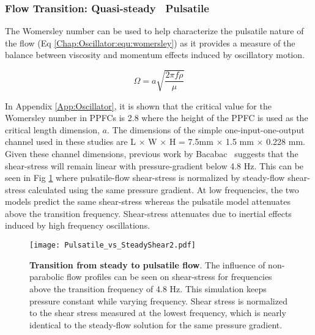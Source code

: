 \subsubsection{Flow Transition: Quasi-steady \vs\ Pulsatile}
The Womersley number can be used to help characterize the pulsatile nature of the flow (Eq \ref{Chap:Oscillator:equ:womersley}) as it provides a measure of the balance between viscosity and momentum effects induced by oscillatory motion. 

\begin{equation}
\Omega = a \sqrt{\frac{2 \pi f \rho}{\mu}}
\label{Chap:Oscillator:equ:womersley}
\end{equation}
 
In Appendix \ref{App:Oscillator}, it is shown that the critical value for the Womersley number in PPFCs is 2.8 where the height of the PPFC is used as the critical length dimension, $a$. The dimensions of the simple one-input-one-output channel used in these studies are L $\times$ W $\times$ H = 7.5mm $\times$ 1.5 mm $\times$ 0.228 mm. Given these channel dimensions, previous work by Bacabac \etal\ suggests that the shear-stress will remain linear with pressure-gradient below 4.8 Hz. This can be seen in Fig \ref{Chap:Oscillator:fig:flowTransition} where pulsatile-flow shear-stress is normalized by steady-flow shear-stress calculated using the same pressure gradient. At low frequencies, the two models predict the same shear-stress whereas the pulsatile model attenuates above the transition frequency. Shear-stress attenuates due to inertial effects induced by high frequency oscillations.

\begin{figure}[!ht]
\centering
\texttt{[image: Pulsatile\_vs\_SteadyShear2.pdf]}
\caption{\textbf{Transition from steady to pulsatile flow}. The influence of non-parabolic flow profiles can be seen on shear-stress for frequencies above the transition frequency of 4.8 Hz. This simulation keeps pressure constant while varying frequency. Shear stress is normalized to the shear stress measured at the lowest frequency, which is nearly identical to the steady-flow solution for the same pressure gradient.}
\label{Chap:Oscillator:fig:flowTransition}
\end{figure}

